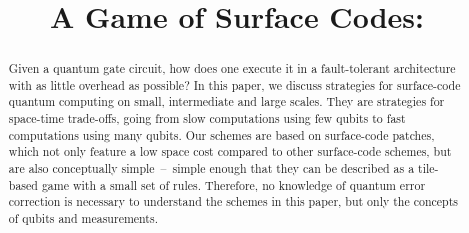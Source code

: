 \documentclass[prx,aps,letterpaper,twocolumn,allowfontchageintitle=true,accepted=2019-02-01]{quantumarticle}
\begin{document}
\title{\centering \color{quantumviolet} A Game of Surface Codes:  \newpage}
\author{\vspace{-5ex}}

\date{\vspace{-5ex}}


{\centering \maketitle}

\begin{abstract}


Given a quantum gate circuit, how does one execute it in a fault-tolerant architecture with as little overhead as possible? In this paper, we discuss strategies for surface-code quantum computing on small, intermediate and large scales. They are strategies for space-time trade-offs, going from slow computations using few qubits to fast computations using many qubits. Our schemes are based on surface-code patches, which not only feature a low space cost compared to other surface-code schemes, but are also conceptually simple~--~simple enough that they can be described as a tile-based game with a small set of rules. Therefore, no knowledge of quantum error correction is necessary to understand the schemes in this paper, but only the concepts of qubits and measurements.

\end{abstract}




\end{document}
